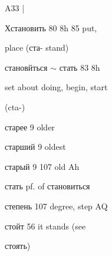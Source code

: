 \begin{minipage}[t]{0.475\textwidth}
\noindent A33 |\par
\noindent Хстановить 80 8h 85 put,\par
\noindent place (ста- stand)\par
\noindent становйться $\sim$ стать 83 8h\par
\noindent set about doing, begin, start\par
\noindent (cta-)\par
\noindent старее 9 older\par
\noindent старший 9 oldest\par
\noindent старый 9 107 old Ah\par
\noindent стать pf. of становиться\par
\noindent степень 107 degree, step AQ\par
\noindent стойт 56 it stands (see\par
\noindent стоять)\par
\end{minipage}\hfill
